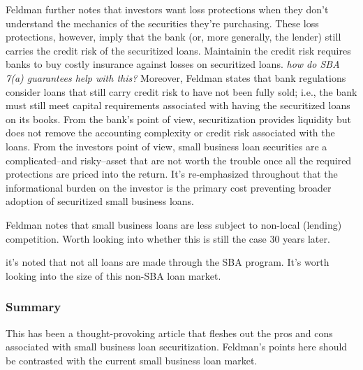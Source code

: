 Feldman further notes that investors want loss protections when they don't understand the mechanics of the securities they're purchasing.  These loss protections, however, imply that the bank (or, more generally, the lender) still carries the credit risk of the securitized loans.  Maintainin the credit risk requires banks to buy costly insurance against losses on securitized loans.  \note{[Consider]:} {\it how do SBA 7(a) guarantees help with this?}  Moreover, Feldman states that bank regulations consider loans that still carry credit risk to have not been fully sold; i.e., the bank must still meet capital requirements associated with having the securitized loans on its books.  From the bank's point of view, securitization provides liquidity but does not remove the accounting complexity or credit risk associated with the loans.  From the investors point of view, small business loan securities are a complicated--and risky--asset that are not worth the trouble once all the required protections are priced into the return.  It's re-emphasized throughout that the informational burden on the investor is the primary cost preventing broader adoption of securitized small business loans.

\note{[Competition]:} Feldman notes that small business loans are less subject to non-local (lending) competition.  Worth looking into whether this is still the case 30 years later.

 it's noted that not all loans are made through the SBA program.  It's worth looking into the size of this non-SBA loan market.


\subsubsection{Summary}

This has been a thought-provoking article that fleshes out the pros and cons associated with small business loan securitization.  Feldman's points here should be contrasted with the current small business loan market.
